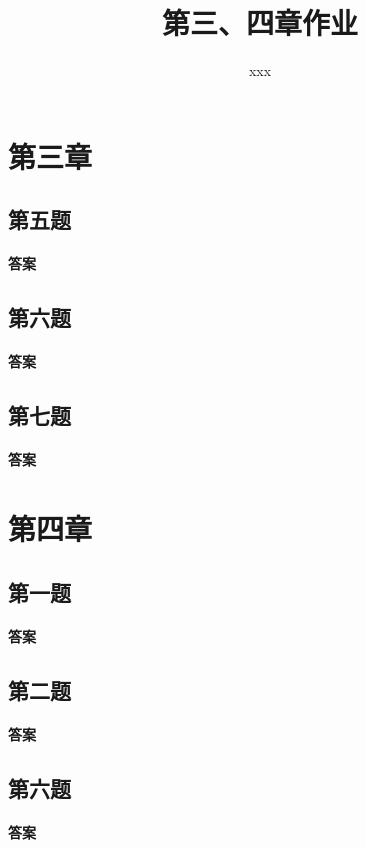 \documentclass[UTF8]{article}
\title{第三、四章作业}
\author{xxx}
\begin{document}
\date{}
\maketitle
\section{第三章}
\subsection{第五题}
\paragraph{答案}

\subsection{第六题}
\paragraph{答案}

\subsection{第七题}
\paragraph{答案}

\section{第四章}
\subsection{第一题}
\paragraph{答案}

\subsection{第二题}
\paragraph{答案}

\subsection{第六题}
\paragraph{答案}
\end{document}
